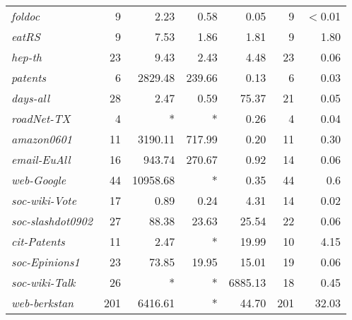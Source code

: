 \begin{table}[tbh]
\begin{tabular}{lr|rrr|rr}
{\it foldoc}	&	9	&	2.23	&	0.58	&	0.05	&	9	&	$<$0.01	\\
{\it eatRS}	&	9	&	7.53	&	1.86	&	1.81	&	9	&	1.80	\\
{\it hep-th}	&	23	&	9.43	&	2.43	&	4.48	&	23	&	0.06	\\
{\it patents}	&	6	&	2829.48	&	239.66	&	0.13	&	6	&	0.03	\\
{\it days-all}	&	28	&	2.47	&	0.59	&	75.37	&	21	&	0.05	\\
\midrule
{\it roadNet-TX}	&	4	&	*	&	*	&	0.26	&	4	&	0.04	\\
{\it amazon0601}	&	11	&	3190.11	&	717.99	&	0.20	&	11	&	0.30	\\
{\it email-EuAll}	&	16	&	943.74	&	270.67	&	0.92	&	14	&	0.06	\\
{\it web-Google}	&	44	&	10958.68	&	*	&	0.35	&	44	&	0.6	\\
{\it soc-wiki-Vote}	&	17	&	0.89	&	0.24	&	4.31	&	14	&	0.02	\\
{\it soc-slashdot0902}	&	27	&	88.38	&	23.63	&	25.54	&	22	&	0.06	\\
{\it cit-Patents}	&	11	&	2.47	&	*	&	19.99	&	10	&	4.15	\\
{\it soc-Epinions1}	&	23	&	73.85	&	19.95	&	15.01	&	19	&	0.06	\\
{\it soc-wiki-Talk}	&	26	&	*	&	*	&	6885.13	&	18	&	0.45	\\
{\it web-berkstan}	&	201	&	6416.61	&	*	&	44.70	&	201	&	32.03	\\
	\bottomrule\bottomrule
\end{tabular}
\end{table}
